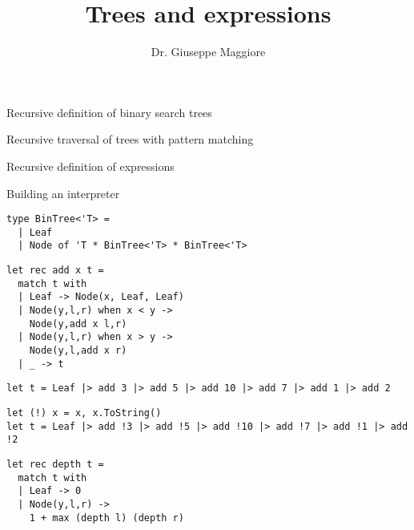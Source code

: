 \documentclass{beamer}
\title{Trees and expressions}
\author{Dr. Giuseppe Maggiore}
\institute{Hogeschool Rotterdam \\ 
Rotterdam, Netherlands}
\date{}
\begin{document}
\maketitle

\begin{slide}{
\item Recursive definition of binary search trees
\item Recursive traversal of trees with pattern matching
\item Recursive definition of expressions
\item Building an interpreter
}\end{slide}

\begin{frame}[fragile]
\begin{lstlisting}
type BinTree<'T> =
  | Leaf
  | Node of 'T * BinTree<'T> * BinTree<'T>
\end{lstlisting}
\end{frame}

\begin{frame}[fragile]
\begin{lstlisting}
let rec add x t =
  match t with
  | Leaf -> Node(x, Leaf, Leaf)
  | Node(y,l,r) when x < y ->
    Node(y,add x l,r)
  | Node(y,l,r) when x > y ->
    Node(y,l,add x r)
  | _ -> t
\end{lstlisting}
\end{frame}

\begin{frame}[fragile]
\begin{lstlisting}
let t = Leaf |> add 3 |> add 5 |> add 10 |> add 7 |> add 1 |> add 2
\end{lstlisting}
\end{frame}

\begin{frame}[fragile]
\begin{lstlisting}
let (!) x = x, x.ToString()
let t = Leaf |> add !3 |> add !5 |> add !10 |> add !7 |> add !1 |> add !2
\end{lstlisting}
\end{frame}

\begin{frame}[fragile]
\begin{lstlisting}
let rec depth t =
  match t with
  | Leaf -> 0
  | Node(y,l,r) ->
    1 + max (depth l) (depth r)
\end{lstlisting}
\end{frame}
\end{document}
